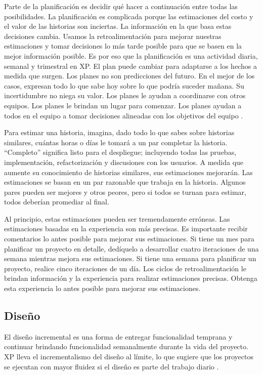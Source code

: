 \begin{spacing}{1.5}
				Parte de la planificación es decidir qué hacer a continuación entre todas las posibilidades. La planificación es complicada porque las estimaciones del costo y el valor de las historias son inciertas. La información en la que basa estas decisiones cambia. Usamos la retroalimentación para mejorar nuestras estimaciones y tomar decisiones lo más tarde posible para que se basen en la mejor información posible. Es por eso que la planificación es una actividad diaria, semanal y trimestral en XP. El plan puede cambiar para adaptarse a los hechos a medida que surgen.
				Los planes no son predicciones del futuro. En el mejor de los casos, expresan todo lo que sabe hoy sobre lo que podría suceder mañana. Su incertidumbre no niega su valor. Los planes le ayudan a coordinarse con otros equipos. Los planes le brindan un lugar para comenzar. Los planes ayudan a todos en el equipo a tomar decisiones alineadas con los objetivos del equipo \cite{chap2_extreme_programming}.
				
				Para estimar una historia, imagina, dado todo lo que sabes sobre historias similares, cuántas horas o días le tomará a un par completar la historia. “Completo” significa listo para el despliegue; incluyendo todas las pruebas, implementación, refactorización y discusiones con los usuarios. A medida que aumente su conocimiento de historias similares, sus estimaciones mejorarán. Las estimaciones se basan en un par razonable que trabaja en la historia. Algunos pares pueden ser mejores y otros peores, pero si todos se turnan para estimar, todos deberían promediar al final.
				
				Al principio, estas estimaciones pueden ser tremendamente erróneas. Las estimaciones basadas en la experiencia son más precisas. Es importante recibir comentarios lo antes posible para mejorar sus estimaciones. Si tiene un mes para planificar un proyecto en detalle, dedíquelo a desarrollar cuatro iteraciones de una semana mientras mejora sus estimaciones. Si tiene una semana para planificar un proyecto, realice cinco iteraciones de un día. Los ciclos de retroalimentación le brindan información y la experiencia para realizar estimaciones precisas. Obtenga esta experiencia lo antes posible para mejorar sus estimaciones.
	\subsection{Diseño}
				El diseño incremental es una forma de entregar funcionalidad temprana y continuar brindando funcionalidad semanalmente durante la vida del proyecto. XP lleva el incrementalismo del diseño al límite, lo que sugiere que los proyectos se ejecutan con mayor fluidez si el diseño es parte del trabajo diario \cite{chap2_extreme_programming}.
				

\end{spacing}
